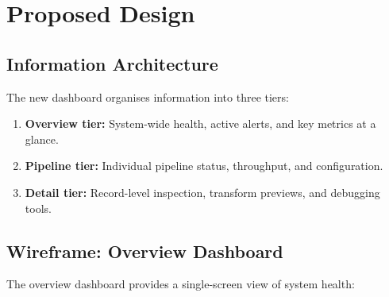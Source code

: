 \documentclass[
    language=english,
    doctype=technical-report,
    institution=none,
    titlestyle=book,
    oneside,
]{../../omnilatex}
\begin{document}
\chapter{Proposed Design}
\label{sec:proposed-design}

\section{Information Architecture}

The new dashboard organises information into three tiers:

\begin{enumerate}
    \item \textbf{Overview tier:} System-wide health, active alerts, and
        key metrics at a glance.
    \item \textbf{Pipeline tier:} Individual pipeline status, throughput,
        and configuration.
    \item \textbf{Detail tier:} Record-level inspection, transform
        previews, and debugging tools.
\end{enumerate}

\section{Wireframe: Overview Dashboard}

The overview dashboard provides a single-screen view of system health:
\end{document}
